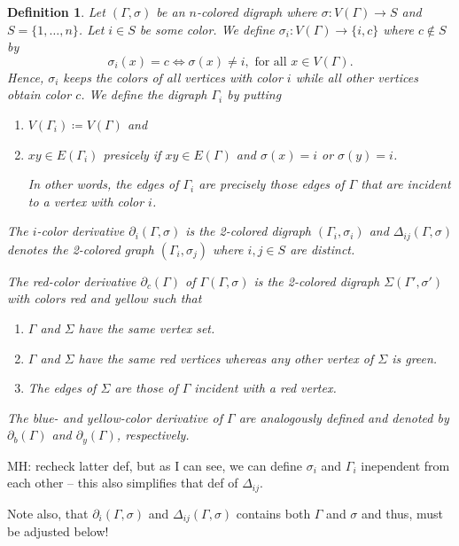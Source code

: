 \documentclass[final,3p,times]{elsarticle}
\newtheorem{definition}{Definition}[section]
\newcommand{\TODO}[1]{\begingroup\color{red}#1\endgroup}
\newcommand{\OLD}[1]{\begingroup\tiny\color{gray}#1\endgroup}
\newcommand{\mh}[1]{\begingroup\color{magenta}#1\endgroup}
\begin{document}
\begin{definition}
\label{def:color-derivative}
\mh{Let $(\Gamma,\sigma)$ be an $n$-colored digraph where $\sigma\colon V(\Gamma) \to S$ 
and $S = \{1,\dots,n\}$. Let $i\in S$ be some color. We define
$\sigma_i\colon V(\Gamma) \to \{i,c\}$ where $c\notin S$
by \[\sigma_i(x)=c \iff \sigma(x)\neq i, \text{ for all } x\in V(\Gamma).\]
Hence, $\sigma_i$ keeps the colors of all vertices with color $i$ while
all other vertices obtain color $c$. 
We define the digraph $\Gamma_i$ by putting
\begin{enumerate}
    \item $V(\Gamma_i) \coloneqq V(\Gamma)$ and
    
    \item $xy\in E(\Gamma_i)$  presicely if $xy\in E(\Gamma)$ and 
    	  $\sigma(x)=i	$ or  $\sigma(y)=i$.
    	  
    	  In other words, the edges of $\Gamma_i$ are precisely those edges 
    	  of $\Gamma$ that are incident to a vertex with color $i$.
\end{enumerate}
%
The \emph{$i$-color derivative} $\partial_i(\Gamma,\sigma)$ is the 2-colored
digraph $(\Gamma_i,\sigma_i)$ and $\Delta_{ij}(\Gamma,\sigma)$ denotes the
2-colored graph $(\Gamma_i,\sigma_j)$ where $i,j\in S$ are distinct. 
}






\OLD{
The \emph{red-color derivative} $\partial_c(\Gamma)$ of
\OLD{$\Gamma$}\mh{$(\Gamma,\sigma)$} is the 2-colored digraph
\OLD{$\Sigma$}\mh{$(\Gamma',\sigma')$} with colors red and yellow such that
\begin{enumerate}
    \item $\Gamma$ and $\Sigma$ have the same vertex set. 
    \item $\Gamma$ and $\Sigma$ have the same red vertices whereas any other vertex of $\Sigma$ is green. 
    \item The edges of $\Sigma$ are those of $\Gamma$ incident with a red vertex. 
\end{enumerate}
The blue- and yellow-color derivative of $\Gamma$ are analogously defined and
denoted by $\partial_b(\Gamma)$ and $\partial_y(\Gamma)$, respectively. }
\end{definition} 
 


\TODO{MH: recheck latter def, but as I can see, we can define $\sigma_i$ and $\Gamma_i$
inependent from each other -- this also simplifies that def of $\Delta_{ij}$. 

Note also, that $\partial_i(\Gamma,\sigma)$ and $\Delta_{ij}(\Gamma,\sigma)$
contains both $\Gamma$ and $\sigma$ and thus, must be adjusted below!
}
\end{document}
